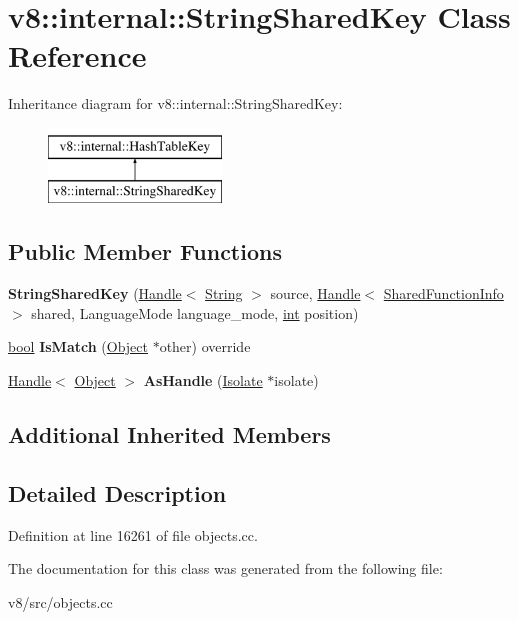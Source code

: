 \hypertarget{classv8_1_1internal_1_1StringSharedKey}{}\section{v8\+:\+:internal\+:\+:String\+Shared\+Key Class Reference}
\label{classv8_1_1internal_1_1StringSharedKey}
Inheritance diagram for v8\+:\+:internal\+:\+:String\+Shared\+Key\+:\begin{figure}[H]
\begin{center}
\leavevmode
\includegraphics[height=2.000000cm]{classv8_1_1internal_1_1StringSharedKey}
\end{center}
\end{figure}
\subsection*{Public Member Functions}
\begin{DoxyCompactItemize}
\item 
\mbox{\label{classv8_1_1internal_1_1StringSharedKey_aba9c01ad43469c64a3c64a5a45e3e195}} 
{\bfseries String\+Shared\+Key} (\mbox{\hyperlink{classv8_1_1internal_1_1Handle}{Handle}}$<$ \mbox{\hyperlink{classv8_1_1internal_1_1String}{String}} $>$ source, \mbox{\hyperlink{classv8_1_1internal_1_1Handle}{Handle}}$<$ \mbox{\hyperlink{classv8_1_1internal_1_1SharedFunctionInfo}{Shared\+Function\+Info}} $>$ shared, Language\+Mode language\+\_\+mode, \mbox{\hyperlink{classint}{int}} position)
\item 
\mbox{\label{classv8_1_1internal_1_1StringSharedKey_a70350a4d919d8e3cd721f43e69021ef7}} 
\mbox{\hyperlink{classbool}{bool}} {\bfseries Is\+Match} (\mbox{\hyperlink{classv8_1_1internal_1_1Object}{Object}} $\ast$other) override
\item 
\mbox{\label{classv8_1_1internal_1_1StringSharedKey_a96fa2679463f1e5390748caa64019c22}} 
\mbox{\hyperlink{classv8_1_1internal_1_1Handle}{Handle}}$<$ \mbox{\hyperlink{classv8_1_1internal_1_1Object}{Object}} $>$ {\bfseries As\+Handle} (\mbox{\hyperlink{classv8_1_1internal_1_1Isolate}{Isolate}} $\ast$isolate)
\end{DoxyCompactItemize}
\subsection*{Additional Inherited Members}


\subsection{Detailed Description}


Definition at line 16261 of file objects.\+cc.



The documentation for this class was generated from the following file\+:\begin{DoxyCompactItemize}
\item 
v8/src/objects.\+cc\end{DoxyCompactItemize}
